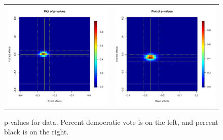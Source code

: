 \documentclass[12pt]{article}
\begin{document}
\begin{figure}
	\centering
	\begin{tabular}{cc}
	\includegraphics[scale=0.45]{./images/pval_plot_broockman_demvotepct.pdf} &
	\includegraphics[scale=0.45]{./images/pval_plot_broockman_blackpct.pdf} \\ 
	\end{tabular}
	\caption{p-values for \citet{broockman2013black} data. Percent democratic vote is on the left, and percent black is on the right.}
\end{figure}
\end{document}
